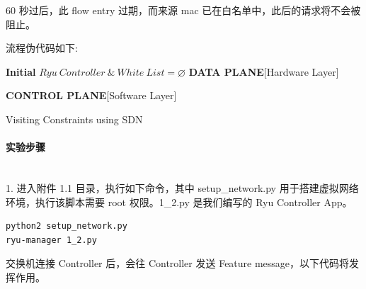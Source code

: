 \documentclass[format=draft,language=chinese,category=SDN]{hustreport}
\newcommand{\myparagraph}[1]{\paragraph{#1}\mbox{}\\}
\begin{document}
60 秒过后，此 flow entry 过期，而来源 mac 已在白名单中，此后的请求将不会被阻止。

流程伪代码如下:

\begin{algorithm}[H]
	\SetAlgoLined
	\textbf{Initial}  $Ryu~Controller~\&~White~List = \varnothing$ \;\label{alg_line:Q1_2DataPlane}
	\textbf{DATA PLANE}[Hardware Layer]\;

	\textbf{CONTROL PLANE}[Software Layer]\;
	\caption{Visiting Constraints using SDN}\label{alg:Q1_2}
\end{algorithm}

\myparagraph{实验步骤}
1. 进入附件 1.1 目录，执行如下命令，其中 setup\_network.py 用于搭建虚拟网络环境，执行该脚本需要 root 权限。1\_2.py 是我们编写的 Ryu Controller App。

\begin{lstlisting}
python2 setup_network.py
ryu-manager 1_2.py
\end{lstlisting}

交换机连接 Controller 后，会往 Controller 发送 Feature message，以下代码将发挥作用。
\end{document}
